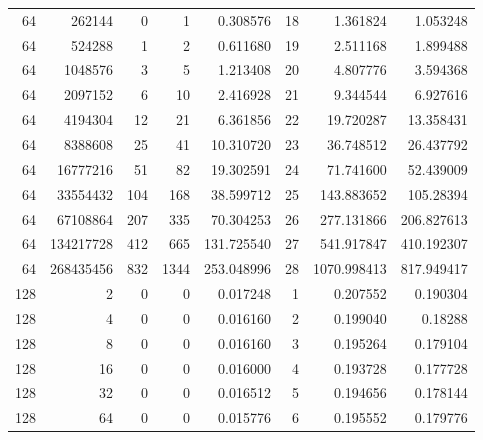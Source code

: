 \begin{longtable}[c]{@{}rrrrrrrr@{}}
    64        & 262144    & 0         & 1        & 0.308576    & 18                  & 1.361824    & 1.053248   \\
    64        & 524288    & 1         & 2        & 0.611680    & 19                  & 2.511168    & 1.899488   \\
    64        & 1048576   & 3         & 5        & 1.213408    & 20                  & 4.807776    & 3.594368   \\
    64        & 2097152   & 6         & 10       & 2.416928    & 21                  & 9.344544    & 6.927616   \\
    64        & 4194304   & 12        & 21       & 6.361856    & 22                  & 19.720287   & 13.358431  \\
    64        & 8388608   & 25        & 41       & 10.310720   & 23                  & 36.748512   & 26.437792  \\
    64        & 16777216  & 51        & 82       & 19.302591   & 24                  & 71.741600   & 52.439009  \\
    64        & 33554432  & 104       & 168      & 38.599712   & 25                  & 143.883652  & 105.28394  \\
    64        & 67108864  & 207       & 335      & 70.304253   & 26                  & 277.131866  & 206.827613 \\
    64        & 134217728 & 412       & 665      & 131.725540  & 27                  & 541.917847  & 410.192307 \\
    64        & 268435456 & 832       & 1344     & 253.048996  & 28                  & 1070.998413 & 817.949417 \\
    128       & 2         & 0         & 0        & 0.017248    & 1                   & 0.207552    & 0.190304   \\
    128       & 4         & 0         & 0        & 0.016160    & 2                   & 0.199040    & 0.18288    \\
    128       & 8         & 0         & 0        & 0.016160    & 3                   & 0.195264    & 0.179104   \\
    128       & 16        & 0         & 0        & 0.016000    & 4                   & 0.193728    & 0.177728   \\
    128       & 32        & 0         & 0        & 0.016512    & 5                   & 0.194656    & 0.178144   \\
    128       & 64        & 0         & 0        & 0.015776    & 6                   & 0.195552    & 0.179776   \\

\end{longtable}
